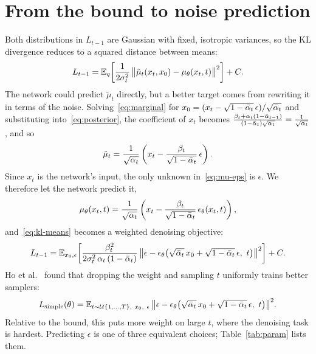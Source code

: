 \section{From the bound to noise prediction}\label{sec:eps}
Both distributions in $L_{t-1}$ are Gaussian with fixed, isotropic variances, so the KL divergence reduces to a squared distance between means:
\begin{equation}\label{eq:kl-means}
  L_{t-1} = \mathbb{E}_q\!\left[\frac{1}{2\sigma_t^2}\,\big\|\tilde\mu_t(x_t, x_0) - \mu_\theta(x_t, t)\big\|^2\right] + C .
\end{equation}
The network could predict $\tilde\mu_t$ directly, but a better target comes from rewriting it in terms of the noise.
Solving~\eqref{eq:marginal} for $x_0 = (x_t - \sqrt{1-\bar\alpha_t}\,\epsilon)/\sqrt{\bar\alpha_t}$ and substituting into~\eqref{eq:posterior}, the coefficient of $x_t$ becomes $\frac{\beta_t + \alpha_t(1-\bar\alpha_{t-1})}{(1-\bar\alpha_t)\sqrt{\alpha_t}} = \frac{1}{\sqrt{\alpha_t}}$, and so
\begin{equation}\label{eq:mu-eps}
  \tilde\mu_t = \frac{1}{\sqrt{\alpha_t}}\left(x_t - \frac{\beta_t}{\sqrt{1-\bar\alpha_t}}\,\epsilon\right).
\end{equation}
Since $x_t$ is the network's input, the only unknown in~\eqref{eq:mu-eps} is $\epsilon$. We therefore let the network predict it,
\begin{equation}\label{eq:mu-theta}
  \mu_\theta(x_t, t) = \frac{1}{\sqrt{\alpha_t}}\left(x_t - \frac{\beta_t}{\sqrt{1-\bar\alpha_t}}\,\epsilon_\theta(x_t, t)\right),
\end{equation}
and~\eqref{eq:kl-means} becomes a weighted denoising objective:
\begin{equation}\label{eq:weighted}
  L_{t-1} = \mathbb{E}_{x_0, \epsilon}\!\left[\frac{\beta_t^2}{2\sigma_t^2\,\alpha_t\,(1-\bar\alpha_t)}\,
  \big\|\epsilon - \epsilon_\theta\big(\sqrt{\bar\alpha_t}\,x_0 + \sqrt{1-\bar\alpha_t}\,\epsilon,\ t\big)\big\|^2\right] + C .
\end{equation}
Ho et al.~\cite{ho2020} found that dropping the weight and sampling $t$ uniformly trains better samplers:
\begin{equation}\label{eq:simple}
  L_{\text{simple}}(\theta) = \E_{t \sim \mathcal{U}\{1, \dots, T\},\ x_0,\ \epsilon}\,\big\|\epsilon - \epsilon_\theta\big(\sqrt{\abar_t}\,x_0 + \sqrt{1-\abar_t}\,\epsilon,\ t\big)\big\|^2 .
\end{equation}
Relative to the bound, this puts more weight on large $t$, where the denoising task is hardest.
Predicting $\epsilon$ is one of three equivalent choices; Table~\ref{tab:param} lists them.

